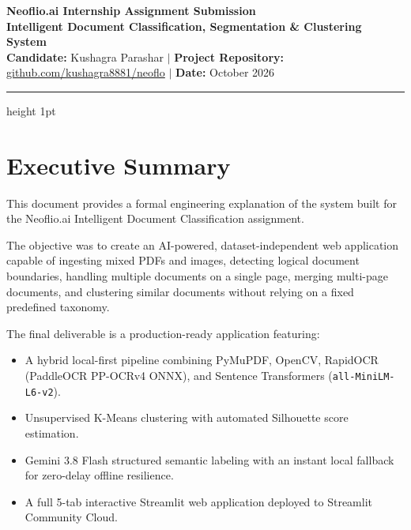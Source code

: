 \documentclass[11pt,a4paper]{article}
\begin{document}
\begin{center}
    {\LARGE \textbf{Neoflio.ai Internship Assignment Submission}}\\[0.2cm]
    {\Large \textbf{Intelligent Document Classification, Segmentation \& Clustering System}}\\[0.3cm]
    \textbf{Candidate:} Kushagra Parashar \quad $\vert$ \quad 
    \textbf{Project Repository:} \href{https://github.com/kushagra8881/neoflo}{github.com/kushagra8881/neoflo} \quad $\vert$ \quad 
    \textbf{Date:} October 2026
\end{center}

\vspace{0.2cm}
\hrule height 1pt
\vspace{0.4cm}

\section{Executive Summary}
This document provides a formal engineering explanation of the system built for the Neoflio.ai Intelligent Document Classification assignment. 

The objective was to create an AI-powered, dataset-independent web application capable of ingesting mixed PDFs and images, detecting logical document boundaries, handling multiple documents on a single page, merging multi-page documents, and clustering similar documents without relying on a fixed predefined taxonomy.

The final deliverable is a production-ready application featuring:
\begin{itemize}[leftmargin=*, noitemsep]
    \item A hybrid local-first pipeline combining PyMuPDF, OpenCV, RapidOCR (PaddleOCR PP-OCRv4 ONNX), and Sentence Transformers (\texttt{all-MiniLM-L6-v2}).
    \item Unsupervised K-Means clustering with automated Silhouette score estimation.
    \item Gemini 3.8 Flash structured semantic labeling with an instant local fallback for zero-delay offline resilience.
    \item A full 5-tab interactive Streamlit web application deployed to Streamlit Community Cloud.
\end{itemize}

\end{document}
